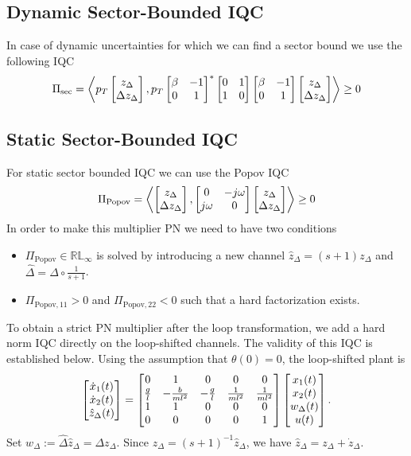\documentclass[journal,10pt,doublecolumn,twoside,a4paper]{IEEEtran}
\begin{document}
\subsection{Dynamic Sector-Bounded IQC}
In case of dynamic uncertainties for which we can find a sector bound we use the following IQC
\begin{equation*}
    \Pi_{\mathrm{sec}} = \left\langle p_T \begin{bmatrix}z_\Delta \\ \Delta z_\Delta\end{bmatrix}, p_T\begin{bmatrix}\beta & -1 \\ 0 & 1\end{bmatrix}^*\begin{bmatrix}0 & 1 \\ 1 & 0\end{bmatrix}\begin{bmatrix}\beta & -1 \\ 0 & 1\end{bmatrix}\begin{bmatrix}z_\Delta \\ \Delta z_\Delta\end{bmatrix} \right\rangle \geq 0
\end{equation*}
\subsection{Static Sector-Bounded IQC}
For static sector bounded IQC we can use the Popov IQC
\begin{equation}
    \Pi_{\mathrm{Popov}} = \left\langle \begin{bmatrix}z_\Delta\\ \Delta z_\Delta\end{bmatrix}, \begin{bmatrix}0 & -j\omega \\ j\omega & 0\end{bmatrix}\begin{bmatrix}z_\Delta \\ \Delta z_\Delta\end{bmatrix} \right\rangle \geq 0
\end{equation}
In order to make this multiplier PN we need to have two conditions
\begin{itemize}
    \item $\Pi_{\mathrm{Popov}}\in\mathbb{RL}_\infty$ is solved by introducing a new channel $\hat{z}_\Delta = (s+1)z_\Delta$ and $\hat{\Delta} = \Delta \circ \frac{1}{s+1}$.
    \item $\Pi_{\mathrm{Popov},11} > 0$ and $\Pi_{\mathrm{Popov},22} < 0$ such that a hard factorization exists.
\end{itemize}
To obtain a strict PN multiplier after the loop transformation, we add a hard
norm IQC directly on the loop-shifted channels. The validity of this IQC is
established below. Using the assumption that $\theta(0)=0$, the loop-shifted
plant is
\begin{equation}\label{eq:pendulum-gp}
    \begin{bmatrix}\dot{x}_1(t) \\ \dot{x}_2(t) \\ \hat{z}_\Delta(t)\end{bmatrix}
    =
    \begin{bmatrix}0 & 1 & 0 & 0 & 0\\
    \frac{g}{l} & -\frac{b}{ml^2} & -\frac{g}{l} & \frac{1}{ml^2} & \frac{1}{ml^2}\\
    1 & 1 & 0 & 0 & 0\\
    0 & 0 & 0 & 0 & 1\end{bmatrix}
    \begin{bmatrix}x_1(t) \\ x_2(t) \\ w_\Delta(t) \\ u(t)\end{bmatrix}.
\end{equation}
Set $w_\Delta:=\hat\Delta\hat z_\Delta=\Delta z_\Delta$. Since
$z_\Delta=(s+1)^{-1}\hat z_\Delta$, we have
$\hat z_\Delta=z_\Delta+\dot z_\Delta$.
\end{document}
